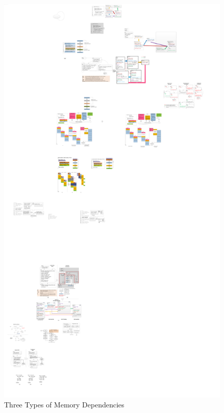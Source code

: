 \begin{figure}[htp]
\begin{center}
\includegraphics[width=0.9\linewidth]{chap3fig/order.pdf}
\caption{Three Types of Memory Dependencies
\label{fig:memorder}}
\end{center}
\end{figure}
 
